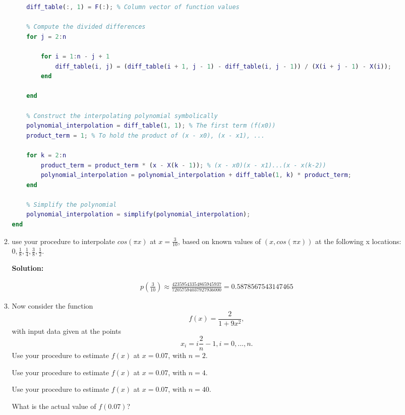 \documentclass[conference,onecolumn]{IEEEtran}
\begin{document}
\begin{enumerate}[label=\arabic{enumi}.]
\begin{enumerate}
\begin{lstlisting}[language=MATLAB]
    % Fill the first column with the function values
    diff_table(:, 1) = F(:); % Column vector of function values

    % Compute the divided differences
    for j = 2:n

        for i = 1:n - j + 1
            diff_table(i, j) = (diff_table(i + 1, j - 1) - diff_table(i, j - 1)) / (X(i + j - 1) - X(i));
        end

    end

    % Construct the interpolating polynomial symbolically
    polynomial_interpolation = diff_table(1, 1); % The first term (f(x0))
    product_term = 1; % To hold the product of (x - x0), (x - x1), ...

    for k = 2:n
        product_term = product_term * (x - X(k - 1)); % (x - x0)(x - x1)...(x - x(k-2))
        polynomial_interpolation = polynomial_interpolation + diff_table(1, k) * product_term;
    end

    % Simplify the polynomial
    polynomial_interpolation = simplify(polynomial_interpolation);
end
                    \end{lstlisting}
              \item use your procedure to interpolate $cos(\pi x)$ at $x = \frac{3}{10}$, based on known values of $(x, cos(\pi x))$ at the following x locations: $0, \frac{1}{8}, \frac{1}{4}, \frac{3}{8}, \frac{1}{2}$.

                    \textbf{Solution:}

                    \begin{align*}
                        p(\frac{3}{10}) \approx \frac{42359543354865945937}{72057594037927936000} = 0.5878567543147465
                    \end{align*}
              \item Now consider the function
                    $$
                        f(x) = \frac{2}{1 + 9x^2},
                    $$
                    with input data given at the points
                    $$
                        x_i = i \frac{2}{n} - 1, i = 0, ... , n.
                    $$
                    Use your procedure to estimate $f(x)$ at $x = 0.07$, with $n = 2$.

                    Use your procedure to estimate $f(x)$ at $x = 0.07$, with $n = 4$.

                    Use your procedure to estimate $f(x)$ at $x = 0.07$, with $n = 40$.

                    What is the actual value of $f(0.07)$?


\end{enumerate}
\end{enumerate}
\end{document}
